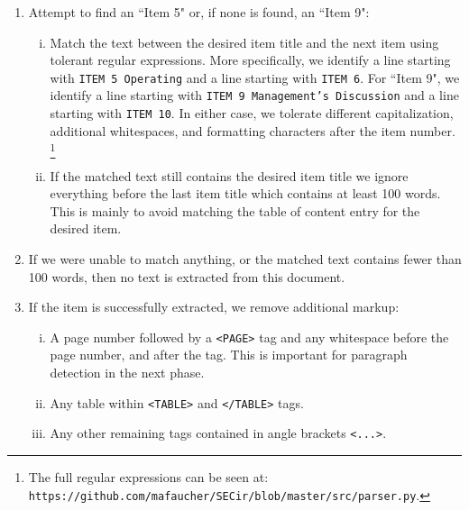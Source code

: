 \begin{enumerate}[A - ]
\begin{enumerate}[1.]
            \item   Attempt to find an ``Item 5" or, if none is found, an ``Item 9":
                \begin{enumerate}[i)]
                    \item   Match the text between the desired item title and the next item
                            using tolerant regular expressions. More specifically, we identify
                            a line starting with \texttt{ITEM 5 Operating} and a line
                            starting with \texttt{ITEM 6}. For ``Item 9", we identify a line
                            starting with \texttt{ITEM 9 Management's Discussion} and a line
                            starting with \texttt{ITEM 10}. In either case, we tolerate different
                            capitalization, additional whitespaces, and formatting characters
                            after the item number.
                            \footnote{The full regular expressions can be seen at:
                            \texttt{https://github.com/mafaucher/SECir/blob/master/src/parser.py}.}
                    \item   If the matched text still contains the desired item title we ignore
                            everything before the last item title which contains at least 100 words.
                            This is mainly to avoid matching the table of content entry for the
                            desired item.
                \end{enumerate}

            \item   If we were unable to match anything, or the matched text contains fewer than
                    100 words, then no text is extracted from this document.

            \item   If the item is successfully extracted, we remove additional markup:
                \begin{enumerate}[i)]
                    \item   A page number followed by a \texttt{<PAGE>} tag and any whitespace
                            before the page number, and after the tag. This is important for
                            paragraph detection in the next phase.
                    \item   Any table within \texttt{<TABLE>} and \texttt{</TABLE>} tags.
                    \item   Any other remaining tags contained in angle brackets \texttt{<...>}.
                \end{enumerate}


\end{enumerate}
\end{enumerate}
